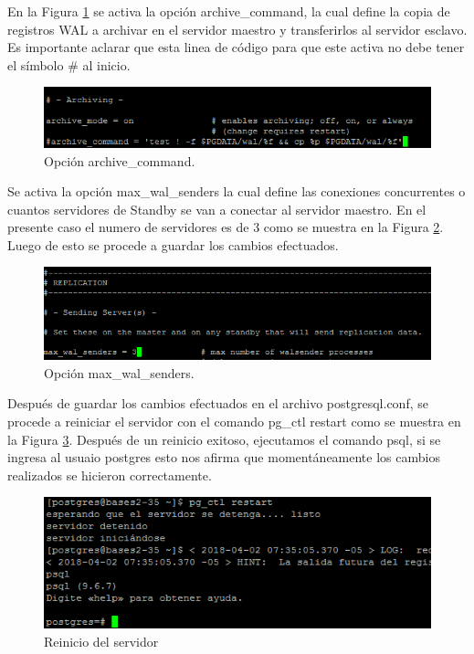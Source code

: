 En la Figura \ref{fig:10} se activa la opción archive\_command, la cual define la copia de registros WAL a archivar en el servidor maestro y transferirlos al servidor esclavo. Es importante aclarar que esta linea de código para que este activa no debe tener el símbolo \# al inicio. 

\begin{figure}[H]
\centering
\includegraphics[width=\columnwidth]{eRelatedWorks/src/10}
\caption{Opción archive\_command.}\label{fig:10}
\end{figure}

Se activa la opción max\_wal\_senders la cual define las conexiones concurrentes o cuantos servidores de Standby se van a conectar al servidor maestro. En el presente caso el numero de servidores es de 3 como se muestra en la Figura \ref{fig:11}. Luego de esto se procede a guardar los cambios efectuados. 

\begin{figure}[H]
\centering
\includegraphics[width=\columnwidth]{eRelatedWorks/src/11}
\caption{Opción max\_wal\_senders. }\label{fig:11}
\end{figure}

Después de guardar los cambios efectuados en el archivo postgresql.conf, se procede a reiniciar  el servidor con el comando pg\_ctl restart como se muestra en la Figura \ref{fig:12}. Después de un reinicio exitoso, ejecutamos el comando psql, si se ingresa al usuaio postgres esto  nos afirma que momentáneamente los cambios realizados se hicieron correctamente. 

\begin{figure}[H]
\centering
\includegraphics[width=\columnwidth]{eRelatedWorks/src/12}
\caption{Reinicio del servidor}\label{fig:12}
\end{figure}

